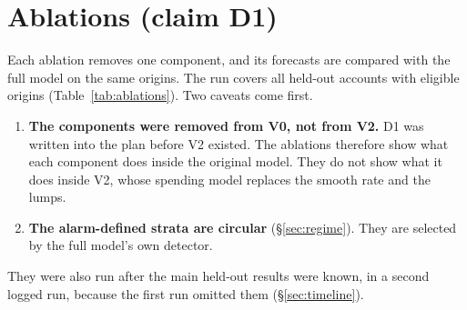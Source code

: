 \section{Ablations (claim D1)}
\label{sec:ablations}

Each ablation removes one component, and its forecasts are compared with
the full model on the same origins. The run covers all
 held-out accounts with eligible
origins (Table~\ref{tab:ablations}). Two caveats come first.
\begin{enumerate}[label=(\roman*)]
\item \textbf{The components were removed from V0, not from V2.} D1 was
  written into the plan before V2 existed. The ablations therefore show what
  each component does inside the original model. They do not show what it
  does inside V2, whose spending model replaces the smooth rate and the
  lumps.
\item \textbf{The alarm-defined strata are circular} (\S\ref{sec:regime}).
  They are selected by the full model's own detector.
\end{enumerate}
They were also run after the main held-out results were known, in a
second logged run, because the first run omitted them
(\S\ref{sec:timeline}).

\begin{table}[t]
\centering\scriptsize\setlength{\tabcolsep}{3.5pt}
\caption{Held-out ablations against V0. Skill: the ablation's CRPS skill
against V0 (positive: the ablation is better). $\Delta$cov90: the
ablation's \lC\% coverage minus V0's, in points. Columns are horizons
(days). Intervals are in the result files.}
\label{tab:ablations}
\end{table}

